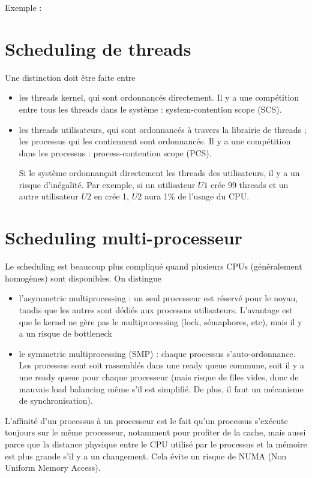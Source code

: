 Exemple :


\section{Scheduling de threads}

Une distinction doit être faite entre

\begin{itemize}
	\item les threads kernel, qui sont ordonnancés directement. Il y a une compétition entre tous les threads dans le système : system-contention scope (SCS).
	\item les threads utilisateurs, qui sont ordonnancés à travers la librairie de threads ; les processus qui les contiennent sont ordonnancés. Il y a une compétition dans les processus : process-contention scope (PCS).
	
	Si le système ordonnançait directement les threads des utilisateurs, il y a un risque d'inégalité. Par exemple, si un utilisateur $U1$ crée 99 threads et un autre utilisateur $U2$ en crée 1, $U2$ aura 1\% de l'usage du CPU.
\end{itemize}

\section{Scheduling multi-processeur}

Le scheduling est beaucoup plus compliqué quand plusieurs CPUs (généralement homogènes) sont disponibles. On distingue

\begin{itemize}
	\item l'asymmetric multiprocessing : un seul processeur est réservé pour le noyau, tandis que les autres sont dédiés aux processus utilisateurs. L'avantage est que le kernel ne gère pas le multiprocessing (lock, sémaphores, etc), mais il y a un risque de bottleneck
	
	\item le symmetric multiprocessing (SMP) : chaque processus s'auto-ordonnance. Les processus sont soit rassemblés dans une ready queue commune, soit il y a une ready queue pour chaque processeur (mais risque de files vides, donc de mauvais load balancing même s'il est simplifié. De plus, il faut un mécanisme de synchronisation).
\end{itemize}

L'affinité d'un processus à un processeur est le fait qu'un processus s'exécute toujours sur le même processeur, notamment pour profiter de la cache, mais aussi parce que la distance physique entre le CPU utilisé par le processus et la mémoire est plus grande s'il y a un changement. Cela évite un risque de NUMA (Non Uniform Memory Access).


